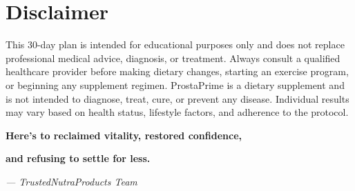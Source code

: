 \documentclass[11pt,oneside]{book}
\begin{document}
\section*{Disclaimer}
This 30-day plan is intended for educational purposes only and does not replace professional medical advice, diagnosis, or treatment. Always consult a qualified healthcare provider before making dietary changes, starting an exercise program, or beginning any supplement regimen. ProstaPrime is a dietary supplement and is not intended to diagnose, treat, cure, or prevent any disease. Individual results may vary based on health status, lifestyle factors, and adherence to the protocol.

\vspace{1.5cm}

\begin{center}
\large\textbf{Here's to reclaimed vitality, restored confidence,}

\large\textbf{and refusing to settle for less.}

\vspace{0.5cm}

\textit{— TrustedNutraProducts Team}
\end{center}
\end{document}
